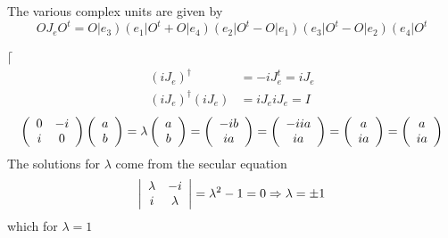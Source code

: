 \documentclass[aps,preprint]{revtex4}%
\begin{document}
\bigskip

The various complex units are given by
\begin{equation}
OJ_{e}O^{t}=O\left\vert e_{3}\right)  \left(  e_{1}\right\vert O^{t}%
+O\left\vert e_{4}\right)  \left(  e_{2}\right\vert O^{t}-O\left\vert
e_{1}\right)  \left(  e_{3}\right\vert O^{t}-O\left\vert e_{2}\right)  \left(
e_{4}\right\vert O^{t}%
\end{equation}


$\lceil$%
\begin{align}
\left(  iJ_{e}\right)  ^{\dagger}  &  =-iJ_{e}^{t}=iJ_{e}\\
\left(  iJ_{e}\right)  ^{\dagger}\left(  iJ_{e}\right)   &  =iJ_{e}iJ_{e}=I
\end{align}%
\begin{equation}
\left(
\begin{array}
[c]{cc}%
0 & -i\\
i & 0
\end{array}
\right)  \left(
\begin{array}
[c]{c}%
a\\
b
\end{array}
\right)  =\lambda\left(
\begin{array}
[c]{c}%
a\\
b
\end{array}
\right)  =\left(
\begin{array}
[c]{c}%
-ib\\
ia
\end{array}
\right)  =\left(
\begin{array}
[c]{c}%
-iia\\
ia
\end{array}
\right)  =\left(
\begin{array}
[c]{c}%
a\\
ia
\end{array}
\right)  =\left(
\begin{array}
[c]{c}%
a\\
ia
\end{array}
\right)
\end{equation}
The solutions for $\lambda$ come from the secular equation
\begin{equation}
\left\vert
\begin{array}
[c]{cc}%
\lambda & -i\\
i & \lambda
\end{array}
\right\vert =\lambda^{2}-1=0\Rightarrow\lambda=\pm1
\end{equation}
which for $\lambda=1$
\end{document}
